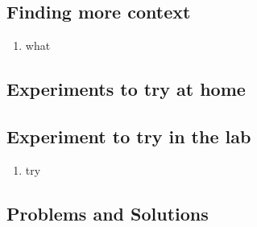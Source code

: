 \subsection{Finding more context}
\begin{enumerate}
\item what
\end{enumerate}

\subsection{Experiments to try at home}

\subsection{Experiment to try in the lab}
\begin{enumerate}
\item try
\end{enumerate}

\subsection{Problems and Solutions}
 